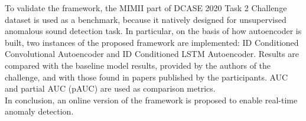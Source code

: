 To validate the framework, the MIMII part of DCASE 2020 Task 2 Challenge dataset is used as a benchmark, because it natively designed for unsupervised anomalous sound detection task. In particular, on the basis of how autoencoder is built, two instances of the proposed framework are implemented: ID Conditioned Convolutional Autoencoder and ID Conditioned LSTM Autoencoder. Results are compared with the baseline model results, provided by the authors of the challenge, and with those found in papers published by the participants. AUC and partial AUC (pAUC) are used as comparison metrics.\\
In conclusion, an online version of the framework is proposed to enable real-time anomaly detection.